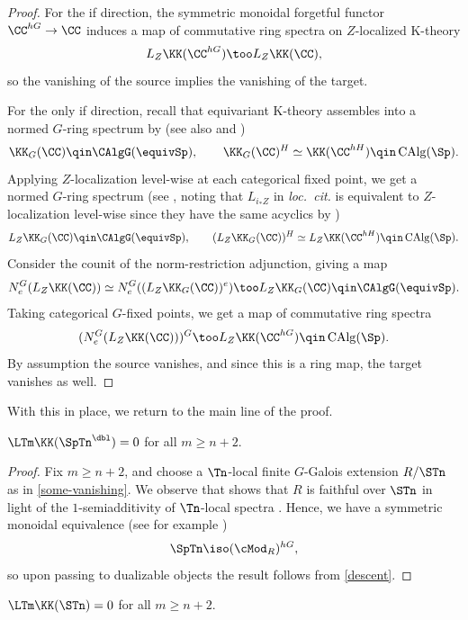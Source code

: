\begin{proof}
	For the if direction, the symmetric monoidal forgetful functor $\CC^{hG} \to \CC$ induces a map of commutative ring spectra on $Z$-localized K-theory
	\[
		L_Z \KK(\CC^{hG}) \too L_Z \KK(\CC),
	\]
	so the vanishing of the source implies the vanishing of the target.

	For the only if direction, recall that equivariant K-theory assembles into a normed $G$-ring spectrum by \cite[Example 3.3.4]{HR} (see also \cite[Corollary 4.3.9]{EH} and \cite[Corollary C]{CHLL})
	\[
		\KK_G(\CC) \qin \CAlgG(\equivSp),
		\qquad \KK_G(\CC)^H \simeq \KK(\CC^{hH}) \qin \CAlg(\Sp).
	\]
	Applying $Z$-localization level-wise at each categorical fixed point, we get a normed $G$-ring spectrum (see \cite[Theorem 3.23]{Hill}, noting that $L_{i_* Z}$ in \emph{loc.\ cit.} is equivalent to $Z$-localization level-wise since they have the same acyclics by \cite[Proposition 3.20]{Hill})
	\[
		L_Z \KK_G(\CC) \qin \CAlgG(\equivSp),
		\qquad (L_Z \KK_G(\CC))^H \simeq L_Z \KK(\CC^{hH}) \qin \CAlg(\Sp).
	\]
	Consider the counit of the norm-restriction adjunction, giving a map
	\[
		N_e^G(L_Z \KK(\CC)) \simeq N_e^G((L_Z \KK_G(\CC))^e) \too L_Z \KK_G(\CC)
		\qin \CAlgG(\equivSp).
	\]
	Taking categorical $G$-fixed points, we get a map of commutative ring spectra
	\[
		(N_e^G(L_Z \KK(\CC)))^G \too L_Z \KK(\CC^{hG})
		\qin \CAlg(\Sp).
	\]
	By assumption the source vanishes, and since this is a ring map, the target vanishes as well.
\end{proof}

With this in place, we return to the main line of the proof.

\begin{prop}\label{SpTn-dbl}
	$\LTm \KK(\SpTn^\dbl) = 0$ for all $m \geq n{+}2$.
\end{prop}

\begin{proof}
	Fix $m \geq n{+}2$, and choose a $\Tn$-local finite $G$-Galois extension $R/\STn$ as in \cref{some-vanishing}.
	We observe that \cite[Proposition 6.3.3]{RognesGalois} shows that $R$ is faithful over $\STn$ in light of the $1$-semiadditivity of $\Tn$-local spectra \cite{Kuhn}.
	Hence, we have a symmetric monoidal equivalence (see for example \cite[Proposition 3.11]{Desc})
	\[
		\SpTn \iso (\cMod_R)^{hG},
	\]
	so upon passing to dualizable objects the result follows from \cref{descent}.
\end{proof}

\begin{prop}\label{STn}
	$\LTm \KK(\STn) = 0$ for all $m \geq n{+}2$.
\end{prop}

